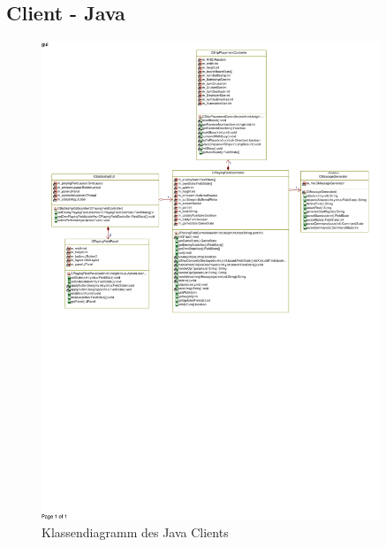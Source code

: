 \subsection{Client - Java}
\label{sec:Javaclient}

\begin{figure}[H]
  \centering
  \includegraphics[trim=5mm 125mm 5mm 4mm,clip,width=0.9\textwidth]{images/CJavaClient.pdf}
  \caption{Klassendiagramm des Java Clients}
  \label{fig:Javaclientklassendiagramm}
\end{figure}
